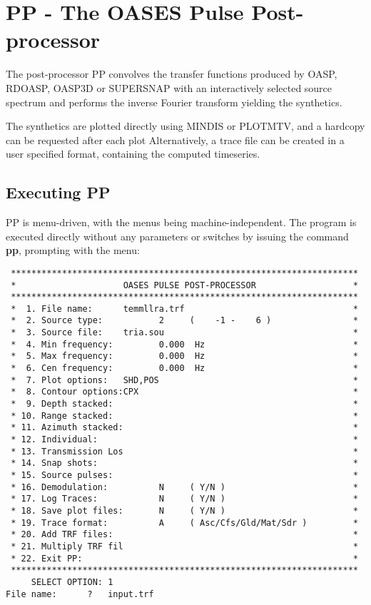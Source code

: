 \section{PP - The OASES Pulse Post-processor}
\label{postproc}
    The  post-processor  PP  convolves  the  transfer   functions 
produced  by OASP, RDOASP, OASP3D or SUPERSNAP with an interactively selected 
source  spectrum 
and   performs  the  inverse  Fourier  transform   yielding   the 
synthetics.

    The  synthetics  are  plotted directly using  MINDIS or PLOTMTV,  and  a 
hardcopy  can  be  requested  after each plot 
Alternatively,  a  trace file can be created in  a  user  specified 
format, containing the computed timeseries.

\subsection{Executing PP}

    PP is menu-driven, with the menus being  machine-independent. 
The  program  is  executed directly  without  any  parameters  or 
switches by issuing the command {\bf pp}, prompting with the menu:

\small
\begin{verbatim}
 ********************************************************************
 *                     OASES PULSE POST-PROCESSOR                   *
 ********************************************************************
 *  1. File name:      temmllra.trf                                 *
 *  2. Source type:           2     (    -1 -    6 )                *
 *  3. Source file:    tria.sou                                     *
 *  4. Min frequency:         0.000  Hz                             *
 *  5. Max frequency:         0.000  Hz                             *
 *  6. Cen frequency:         0.000  Hz                             *
 *  7. Plot options:   SHD,POS                                      *
 *  8. Contour options:CPX                                          *
 *  9. Depth stacked:                                               *
 * 10. Range stacked:                                               *
 * 11. Azimuth stacked:                                             *
 * 12. Individual:                                                  *
 * 13. Transmission Los                                             *
 * 14. Snap shots:                                                  *
 * 15. Source pulses:                                               *
 * 16. Demodulation:          N     ( Y/N )                         *
 * 17. Log Traces:            N     ( Y/N )                         *
 * 18. Save plot files:       N     ( Y/N )                         *
 * 19. Trace format:          A     ( Asc/Cfs/Gld/Mat/Sdr )         *
 * 20. Add TRF files:                                               *
 * 21. Multiply TRF fil                                             *
 * 22. Exit PP:                                                     *
 ********************************************************************
     SELECT OPTION: 1
File name:      ?   input.trf
\end{verbatim}
\normalsize

